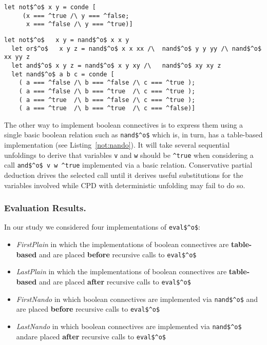 \begin{figure*}[!t]
  \centering
  \begin{minipage}{0.7\textwidth}
    \begin{lstlisting}[label={not:table}, caption={Implementation of boolean \lstinline{not} as a table}, captionpos=b, frame=tb]
  let not$^o$ x y = conde [
     (x === ^true /\ y === ^false;
      x === ^false /\ y === ^true)]
    \end{lstlisting}
  \end{minipage}
  \begin{minipage}{0.9\textwidth}
    \begin{lstlisting}[label={not:nando}, caption={Implementation of boolean operation via \lstinline{nand}}, captionpos=b, frame=tb]
  let not$^o$   x y = nand$^o$ x x y
  let or$^o$   x y z = nand$^o$ x x xx /\  nand$^o$ y y yy /\ nand$^o$ xx yy z
  let and$^o$ x y z = nand$^o$ x y xy /\   nand$^o$ xy xy z
  let nand$^o$ a b c = conde [
    ( a === ^false /\ b === ^false /\ c === ^true );
    ( a === ^false /\ b === ^true  /\ c === ^true );
    ( a === ^true  /\ b === ^false /\ c === ^true );
    ( a === ^true  /\ b === ^true  /\ c === ^false)]
    \end{lstlisting}
  \end{minipage}
\end{figure*}

The other way to implement boolean connectives is to express them using a single basic boolean relation such as \lstinline{nand$^o$} which is, in turn, has a table-based
implementation (see Listing~\ref{not:nando}). It will take several sequential unfoldings to derive that variables \lstinline{v} and \lstinline{w} should
be \lstinline{^true} when considering a call \lstinline{and$^o$ v w ^true} implemented via a basic relation.
Conservative partial deduction drives the selected call until it derives useful substitutions for the variables involved while CPD with deterministic unfolding may fail to do so.

\subsubsection{Evaluation Results.}
In our study we considered four implementations of \lstinline{eval$^o$}:
\begin{itemize}
  \item \emph{FirstPlain} in which the implementations of boolean connectives are \textbf{table-based} and are placed \textbf{before} recursive calls to \lstinline{eval$^o$}
  \item \emph{LastPlain} in which the implementations of boolean connectives are \textbf{table-based} and are placed \textbf{after} recursive calls to \lstinline{eval$^o$}
  \item \emph{FirstNando} in which boolean connectives are implemented via \lstinline{nand$^o$} and are placed \textbf{before} recursive calls to \lstinline{eval$^o$}
  \item \emph{LastNando} in which boolean connectives are implemented via \lstinline{nand$^o$} andare placed \textbf{after} recursive calls to \lstinline{eval$^o$}

\end{itemize}

